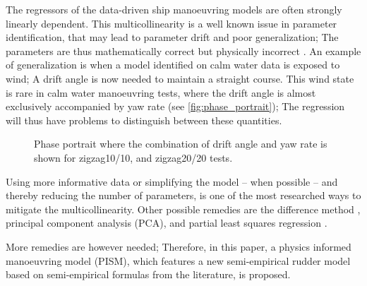 %
The regressors of the data-driven ship manoeuvring models are often strongly linearly dependent. This multicollinearity is a well known issue in parameter identification, that may lead to parameter drift and poor generalization; The parameters are thus mathematically correct but physically incorrect \citep{luo_parameter_2016}. 
An example of generalization is when a model identified on calm water data is exposed to wind; A drift angle is now needed to maintain a straight course. This wind state is rare in calm water manoeuvring tests, where the drift angle is almost exclusively accompanied by yaw rate (see \autoref{fig:phase_portrait}); 
The regression will thus have problems to distinguish between these quantities.
%
\begin{figure}[h]
  \centering
  
  \caption{Phase portrait where the combination of drift angle and yaw rate is shown for zigzag10/10, and zigzag20/20 tests.}
  \label{fig:phase_portrait}
\end{figure}
Using more informative data or simplifying the model -- when possible -- and thereby reducing the number of parameters, is one of the most researched ways to mitigate the multicollinearity. Other possible remedies are the difference method \citep{luo_parameter_2016}, principal component analysis (PCA), and partial least squares regression \citep{jian-chuan_parametric_2015}. 

More remedies are however needed; Therefore, in this paper, a physics informed manoeuvring model (PISM), which features a new semi-empirical rudder model based on semi-empirical formulas from the literature, is proposed.

